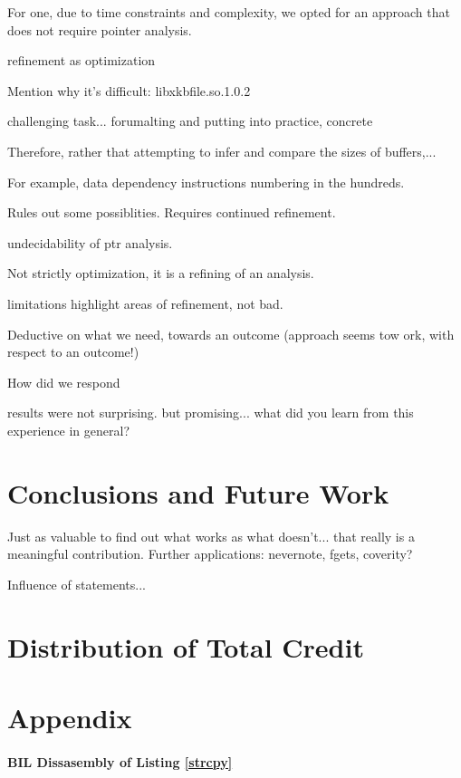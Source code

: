 \documentclass[letterpaper,11pt]{article}
\begin{document}
 For one, due to time constraints and
complexity, we opted for an approach that does not require pointer analysis.


refinement as optimization

Mention why it's difficult: libxkbfile.so.1.0.2

challenging task... forumalting and putting into practice, concrete


Therefore, rather that attempting to infer and compare the sizes of buffers,...

For example, data dependency instructions numbering in the hundreds.


Rules out some possiblities. Requires continued refinement.

undecidability of ptr analysis.


Not strictly optimization, it is a refining of an analysis.

limitations highlight areas of refinement, not bad.

Deductive on what we need, towards an outcome (approach seems tow ork,
with respect to an outcome!)

How did we respond

results were not surprising.
but promising...
what did you learn from this experience in general?

\section{Conclusions and Future Work}

Just as valuable to find out what works as what doesn't... that really
is a meaningful contribution. Further applications: nevernote, fgets, coverity?

Influence of statements...

\section{Distribution of Total Credit}

\clearpage


\appendix
\section{Appendix}
\label{appa}
\paragraph{BIL Dissasembly of Listing \ref{strcpy}}
\end{document}
